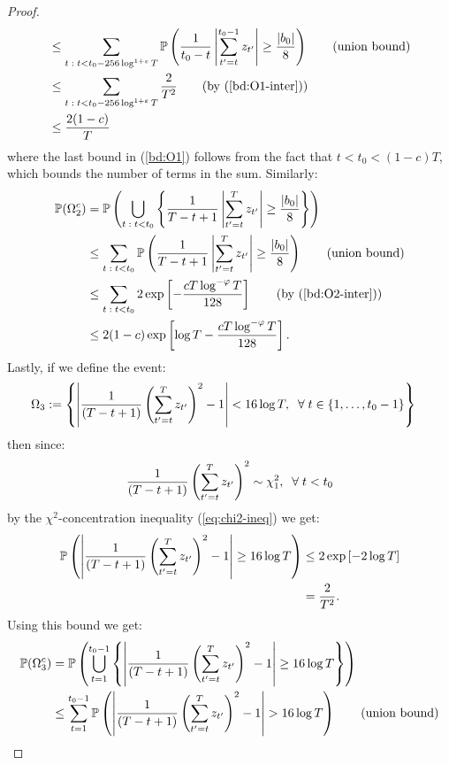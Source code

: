 \begin{proof}
\begin{align}
    &\leq \sum_{ t \;:\; t < t_0 - 256 \log^{1+\varepsilon}T} \mathbb{P}\left(\frac{1}{t_0-t}\left|\sum_{t'=t}^{t_0-1} z_{t'}\right| \geq \frac{|b_0|}{8}\right) \tag{union bound} \\
    &\leq \sum_{ t \;:\; t < t_0 - 256 \log^{1+\varepsilon}T} \frac{2}{T^2} \tag{by (\ref{bd:O1-inter})}\\
    &\leq \frac{2(1-c)}{T} \label{bd:O1}
\end{align}
where the last bound in (\ref{bd:O1}) follows from the fact that $t < t_0 < (1-c)T$, which bounds the number of terms in the sum. Similarly:
\begin{align}
    \mathbb{P}(\Omega^c_2) &= \mathbb{P}\left(\bigcup_{ t \;:\; t < t_0} \left\{
    \frac{1}{T-t+1}\left|\sum_{t'=t}^T z_{t'}\right| \geq \frac{|b_0|}{8}\right\} \right) \notag \\
    &\leq \sum_{ t \;:\; t < t_0} \mathbb{P}\left(\frac{1}{T-t+1}\left|\sum_{t'=t}^T z_{t'}\right| \geq \frac{|b_0|}{8}\right) \tag{union bound} \\
    &\leq \sum_{ t \;:\; t < t_0 } 2 \exp\left[- \frac{cT\log^{-\varphi}T}{128}\right] \tag{by (\ref{bd:O2-inter})}\\
    &\leq 2 (1-c)\exp\left[\log T - \frac{cT\log^{-\varphi}T}{128}\right]. \label{bd:O2}
\end{align}
Lastly, if we define the event:
\begin{align*}
    \Omega_3 &:= \left\{\left|\frac{1}{(T-t+1)}\left(\sum_{t'=t}^{T} z_{t'}\right)^2 - 1\right| < 16 \log T, \; \;\forall\; t \in\{1,\ldots,t_0-1\}\right\}
\end{align*}
then since: 
\begin{align*}
    \frac{1}{(T-t+1)}\left(\sum_{t'=t}^{T} z_{t'}\right)^2 \sim \chi_1^2,\; \;\forall\; t < t_0
\end{align*}
by the $\chi^2$-concentration inequality (\ref{eq:chi2-ineq}) we get: 
\begin{align}
    \mathbb{P}\left(\left|\frac{1}{(T-t+1)}\left(\sum_{t'=t}^{T} z_{t'}\right)^2 - 1\right| \geq 16 \log T\right) &\leq 2\exp\left[-2\log T\right] \notag \\
    &= \frac{2}{T^2}. \label{bd:O3-inter}
\end{align}
Using this bound we get:
\begin{align}
    \mathbb{P}(\Omega^c_3) &= \mathbb{P}\left(\bigcup_{t=1}^{t_0-1} \left\{\left|\frac{1}{(T-t+1)}\left(\sum_{t'=t}^{T} z_{t'}\right)^2 - 1\right| \geq 16 \log T\right\} \right) \notag \\
    &\leq \sum_{t = 1}^{t_0-1} \mathbb{P}\left(\left|\frac{1}{(T-t+1)}\left(\sum_{t'=t}^{T} z_{t'}\right)^2 - 1\right| > 16 \log T\right) \tag{union bound} \\

\end{align}
\end{proof}

